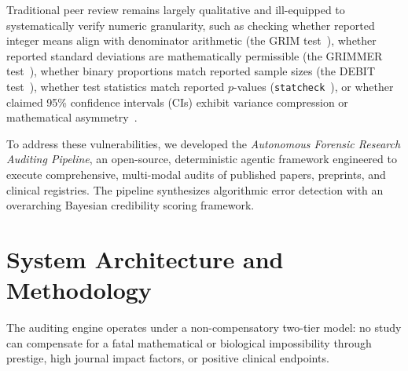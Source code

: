 \documentclass[11pt,a4paper]{article}
\begin{document}
Traditional peer review remains largely qualitative and ill-equipped to systematically verify numeric granularity, such as checking whether reported integer means align with denominator arithmetic (the GRIM test~\cite{brown2017grim}), whether reported standard deviations are mathematically permissible (the GRIMMER test~\cite{allard2018grimmer}), whether binary proportions match reported sample sizes (the DEBIT test~\cite{heathers2019debit}), whether test statistics match reported $p$-values (\texttt{statcheck}~\cite{nuijten2016statcheck}), or whether claimed 95\% confidence intervals (CIs) exhibit variance compression or mathematical asymmetry~\cite{altman2011confidence, guyatt2011grade}.

To address these vulnerabilities, we developed the \textit{Autonomous Forensic Research Auditing Pipeline}, an open-source, deterministic agentic framework engineered to execute comprehensive, multi-modal audits of published papers, preprints, and clinical registries. The pipeline synthesizes algorithmic error detection with an overarching Bayesian credibility scoring framework.

\section{System Architecture and Methodology}
The auditing engine operates under a non-compensatory two-tier model: no study can compensate for a fatal mathematical or biological impossibility through prestige, high journal impact factors, or positive clinical endpoints.
\end{document}
